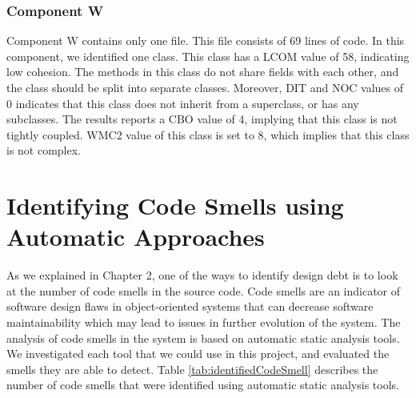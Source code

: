  





\subsubsection{Component W}
Component W contains only one file. This file consists of 69 lines of code. In this component, we identified one class. This class has a LCOM value of 58, indicating low cohesion. The methods in this class do not share fields with each other, and the class should be split into separate classes. Moreover, DIT and NOC values of 0 indicates that this class does not inherit from a superclass, or has any subclasses. The results reports a CBO value of 4, implying that this class is not tightly coupled. WMC2 value of this class is set to 8, which implies that this class is not complex.































\section{Identifying Code Smells using Automatic Approaches}
\label{sub:code_smell_detection}
As we explained in Chapter 2, one of the ways to identify design debt is to look at the number of code smells in the source code. Code smells are an indicator of software design flaws in object-oriented systems that can decrease software maintainability which may lead to issues in further evolution of the system\cite{olbrich2009evolution}. The analysis of code smells in the system is based on automatic static analysis tools. We investigated each tool that we could use in this project, and evaluated the smells they are able to detect. Table \ref{tab:identifiedCodeSmell} describes the number of code smells that were identified using automatic static analysis tools.


